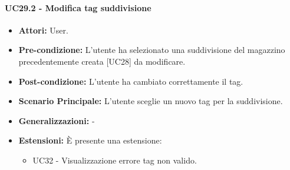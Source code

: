 \paragraph{UC29.2 - Modifica tag suddivisione}
\begin{itemize}
    \item \textbf{Attori:} User.
    \item \textbf{Pre-condizione:}  L'utente ha selezionato una suddivisione del magazzino precedentemente creata [UC28] da modificare.
    \item \textbf{Post-condizione:} L'utente ha cambiato correttamente il tag.
    \item \textbf{Scenario Principale:} L'utente sceglie un nuovo tag per la suddivisione.
    \item \textbf{Generalizzazioni:} -
    \item \textbf{Estensioni:} È presente una estensione:
        \begin{itemize}
            \item UC32 - Visualizzazione errore tag non valido.
        \end{itemize}
\end{itemize}

